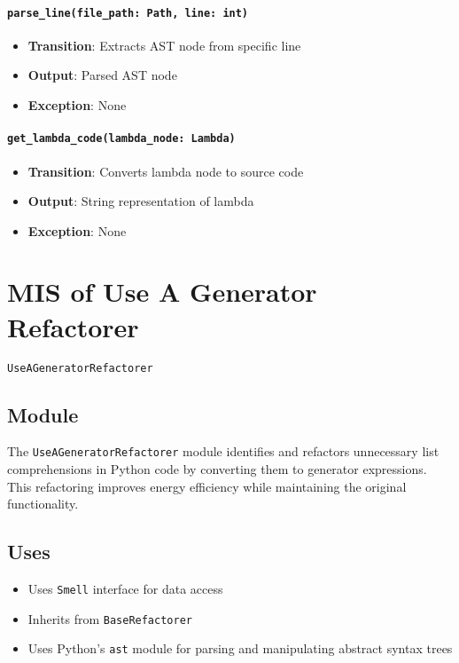 \documentclass[12pt, titlepage]{article}
\begin{document}
\paragraph{\texttt{parse\_line(file\_path: Path, line: int)}}
\begin{itemize}
\item \textbf{Transition}: Extracts AST node from specific line
\item \textbf{Output}: Parsed AST node
\item \textbf{Exception}: None
\end{itemize}

\paragraph{\texttt{get\_lambda\_code(lambda\_node: Lambda)}}
\begin{itemize}
\item \textbf{Transition}: Converts lambda node to source code
\item \textbf{Output}: String representation of lambda
\item \textbf{Exception}: None
\end{itemize}

\newpage
\section{MIS of Use A Generator Refactorer} \label{mis:UseGen}

\texttt{UseAGeneratorRefactorer}

\subsection{Module}

The \texttt{UseAGeneratorRefactorer} module identifies and refactors 
unnecessary list comprehensions in Python code by converting them to generator expressions. This refactoring improves energy efficiency while maintaining the original functionality.

\subsection{Uses}
\begin{itemize}
\item Uses \texttt{Smell} interface for data access
\item Inherits from \texttt{BaseRefactorer}
\item Uses Python's \texttt{ast} module for parsing and manipulating abstract syntax trees
\end{itemize}
\end{document}

